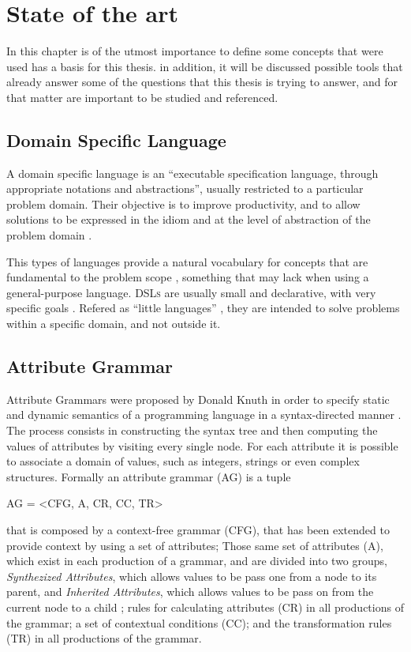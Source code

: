 \chapter{State of the art} \label{state_of_the_art}

In this chapter is of the utmost importance to define some concepts that were used has a basis for this thesis. in addition, it will be discussed possible tools that already answer some of the questions that this thesis is trying to answer, and for that matter are important to be studied and referenced.
	
\section{Domain Specific Language}
A domain specific language is an ``executable specification language, through appropriate notations and abstractions'', usually restricted to a particular problem domain. Their objective is to improve productivity, and to allow solutions to be expressed in the idiom and at the level of abstraction of the problem domain \cite{van_2000}.
	
This types of languages provide a natural vocabulary for concepts that are fundamental to the problem scope \cite{bruce_1997}, something that may lack when using a general-purpose language. \textsc{DSLs} are usually small and declarative, with very specific goals \cite{van_2000}. Refered as ``little languages'' \cite{bentley_1986}, they are intended to solve problems within a specific domain, and not outside it.
	
\section{Attribute Grammar}
Attribute Grammars were proposed by Donald Knuth in order to specify static and dynamic semantics of a programming language in a syntax-directed manner \cite{thirunarayan_2009}. The process consists in constructing the syntax tree and then computing the values of attributes by visiting every single node. For each attribute it is possible to associate a domain of values, such as integers, strings or even complex structures. Formally an attribute grammar (AG) is a tuple \cite{pereira_2016}
	
\begin{description}
    AG = \textless CFG, A, CR, CC, TR\textgreater
\end{description}
that is composed by a context-free grammar (CFG), that has been extended to provide context by using a set of attributes; Those same set of attributes (A), which exist in each production of a grammar, and are divided into two groups, \emph{Synthezized Attributes}, which allows values to be pass one from a node to its parent, and \emph{Inherited Attributes}, which allows values to be pass on from the current node to a child \cite{slonneger_1995}; rules for calculating attributes (CR) in all productions of the grammar; a set of contextual conditions (CC); and the transformation rules (TR) in all productions of the grammar.

